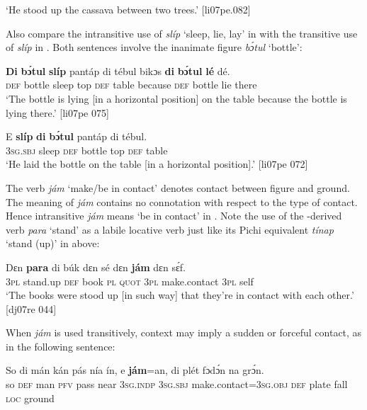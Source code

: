 \glt ‘He stood up the cassava between two trees.’ [li07pe.082]
\z

Also compare the intransitive use of \textit{slíp} ‘sleep, lie, lay’ in  with the transitive use of \textit{slíp} in . Both sentences involve the inanimate figure \textit{bɔ́tul} ‘bottle’: 


\ea%
    \label{ex:key:946}
    \gll \textbf{Di}  \textbf{bɔ́tul}  \textbf{slíp}   pantáp  di  tébul  bikɔs  \textbf{di}  \textbf{bɔ́tul}  \textbf{lé}  dé.\\
\textsc{def}  bottle  sleep  top    \textsc{def}  table  because  \textsc{def}  bottle  lie  there\\

\glt ‘The bottle is lying [in a horizontal position] on the table because the bottle is lying 
there.’ [li07pe 075]
\z


\ea%
    \label{ex:key:947}
    \gll E    \textbf{slíp}    \textbf{di}  \textbf{bɔ́tul}  pantáp  di  tébul.\\
\textsc{3sg.sbj}  sleep  \textsc{def}  bottle  top    \textsc{def}  table\\

\glt ‘He laid the bottle on the table [in a horizontal position].’ [li07pe 072]
\z

The verb \textit{jám} ‘make/be in contact’ denotes contact between figure and ground. The meaning of \textit{jám} contains no connotation with respect to the type of contact. Hence intransitive \textit{jám} means ‘be in contact’ in . Note the use of the -derived verb \textit{para} ‘stand’ as a labile locative verb just like its Pichi equivalent \textit{tínap} ‘stand (up)’ in  above:


\ea%
    \label{ex:key:948}
    \gll Dɛn  \textbf{para}  di  búk    dɛn  sé    dɛn  \textbf{jám}        dɛn  sɛ́f.\\
\textsc{3pl}  stand.up  \textsc{def}  book  \textsc{pl}  \textsc{quot}    \textsc{3pl}  make.contact    \textsc{3pl}  self\\

\glt ‘The books were stood up [in such way] that they’re in contact with each 
other.’ [dj07re 044]
\z

When \textit{jám} is used transitively, context may imply a sudden or forceful contact, as in the following sentence: 


\ea%
    \label{ex:key:949}
    \gll So  di  mán  kán  pás  nía  ín,    e    \textbf{jám}=an, 
di  plét    fɔdɔ́n  na  grɔ́n.\\
so  \textsc{def}  man  \textsc{pfv}  pass  near  \textsc{3sg.indp}  \textsc{3sg.sbj}  make.contact=\textsc{3sg.obj} 
\textsc{def}  plate  fall    \textsc{loc}  ground\\

